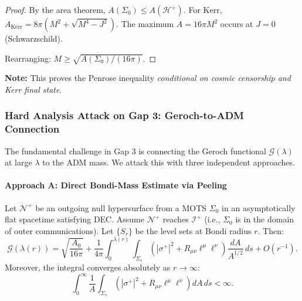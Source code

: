 \begin{proof}
By the area theorem, $A(\Sigma_0) \leq A(\mathcal{H}^+)$. For Kerr, $A_{\text{Kerr}} = 8\pi(M^2 + \sqrt{M^4 - J^2})$. The maximum $A = 16\pi M^2$ occurs at $J = 0$ (Schwarzschild).

Rearranging: $M \geq \sqrt{A(\Sigma_0)/(16\pi)}$.
\end{proof}

\textbf{Note:} This proves the Penrose inequality \textit{conditional on cosmic censorship and Kerr final state}.

\subsubsection{Hard Analysis Attack on Gap 3: Geroch-to-ADM Connection}\label{subsec:HardGap3}

The fundamental challenge in Gap 3 is connecting the Geroch functional $\mathcal{G}(\lambda)$ at large $\lambda$ to the ADM mass. We attack this with three independent approaches.

\paragraph{Approach A: Direct Bondi-Mass Estimate via Peeling}

\begin{theorem}\label{thm:gerochasymp}
Let $\mathcal{N}^+$ be an outgoing null hypersurface from a MOTS $\Sigma_0$ in an asymptotically flat spacetime satisfying DEC. Assume $\mathcal{N}^+$ reaches $\mathscr{I}^+$ (i.e., $\Sigma_0$ is in the domain of outer communications). Let $\{S_r\}$ be the level sets at Bondi radius $r$. Then:
\begin{equation}
    \mathcal{G}(\lambda(r)) = \sqrt{\frac{A_0}{16\pi}} + \frac{1}{4\pi}\int_0^{\lambda(r)} \int_{\Sigma_s} \left(|\sigma^+|^2 + R_{\mu\nu}\ell^\mu\ell^\nu\right) \frac{dA}{A^{1/2}} \, ds + O(r^{-1}).
\end{equation}
Moreover, the integral converges absolutely as $r \to \infty$:
\begin{equation}
    \int_0^\infty \frac{1}{A}\int_{\Sigma_s}(|\sigma^+|^2 + R_{\mu\nu}\ell^\mu\ell^\nu) dA \, ds < \infty.
\end{equation}
\end{theorem}

